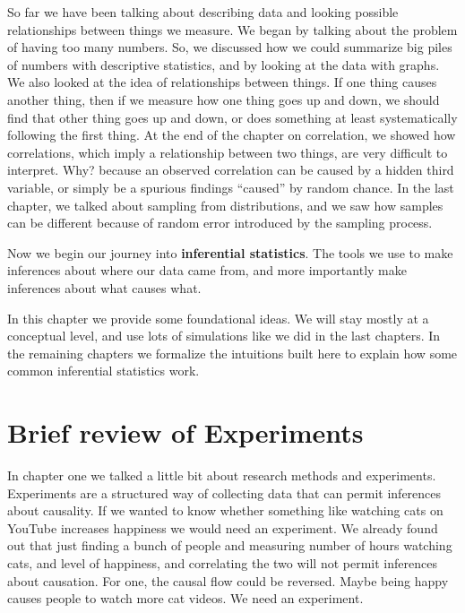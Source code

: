 \documentclass[]{book}
\begin{document}
So far we have been talking about describing data and looking possible relationships between things we measure. We began by talking about the problem of having too many numbers. So, we discussed how we could summarize big piles of numbers with descriptive statistics, and by looking at the data with graphs. We also looked at the idea of relationships between things. If one thing causes another thing, then if we measure how one thing goes up and down, we should find that other thing goes up and down, or does something at least systematically following the first thing. At the end of the chapter on correlation, we showed how correlations, which imply a relationship between two things, are very difficult to interpret. Why? because an observed correlation can be caused by a hidden third variable, or simply be a spurious findings ``caused'' by random chance. In the last chapter, we talked about sampling from distributions, and we saw how samples can be different because of random error introduced by the sampling process.

Now we begin our journey into \textbf{inferential statistics}. The tools we use to make inferences about where our data came from, and more importantly make inferences about what causes what.

In this chapter we provide some foundational ideas. We will stay mostly at a conceptual level, and use lots of simulations like we did in the last chapters. In the remaining chapters we formalize the intuitions built here to explain how some common inferential statistics work.

\hypertarget{brief-review-of-experiments}{%
\section{Brief review of Experiments}\label{brief-review-of-experiments}}

In chapter one we talked a little bit about research methods and experiments. Experiments are a structured way of collecting data that can permit inferences about causality. If we wanted to know whether something like watching cats on YouTube increases happiness we would need an experiment. We already found out that just finding a bunch of people and measuring number of hours watching cats, and level of happiness, and correlating the two will not permit inferences about causation. For one, the causal flow could be reversed. Maybe being happy causes people to watch more cat videos. We need an experiment.
\end{document}
